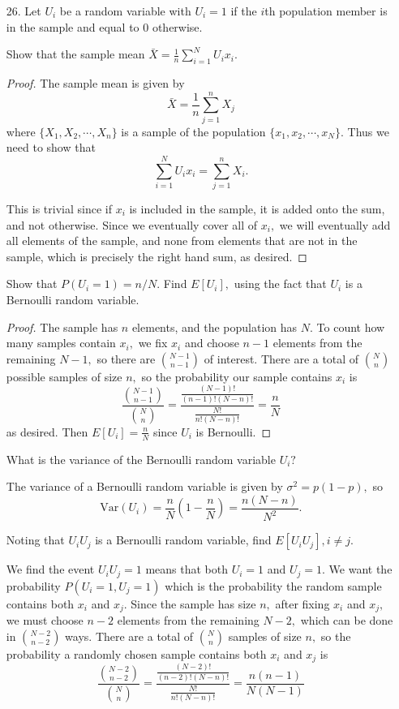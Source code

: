 \documentclass{article}
\newcommand{\var}{\mathrm{Var}}
\begin{document}
\begin{itemize}
	\item[26.] Let $U_i$ be a random variable with $U_i=1$ if the $i$th population member is in the sample and equal to 0 otherwise. 
		\begin{enumerate}[a.]
			\ii Show that the sample mean $\bar{X}=\displaystyle\frac{1}{n}\sum_{i=1}^N U_i x_i.$ 
			\begin{proof}
				The sample mean is given by \[\bar{X}=\frac{1}{n}\sum_{j=1}^n X_j\] where $\{X_1, X_2, \cdots, X_n\}$ is a sample of the population $\{x_1, x_2, \cdots, x_N\}.$ Thus we need to show that \[\sum_{i=1}^N U_i x_i = \sum_{j=1}^n X_i.\] 

			This is trivial since if $x_i$ is included in the sample, it is added onto the sum, and not otherwise. Since we eventually cover all of $x_i,$ we will eventually add all elements of the sample, and none from elements that are not in the sample, which is precisely the right hand sum, as desired.

			\end{proof}
			
			\ii Show that $P(U_i=1)=n/N$. Find $E[U_i],$ using the fact that $U_i$ is a Bernoulli random variable.
			\begin{proof}
				The sample has $n$ elements, and the population has $N.$ To count how many samples contain $x_i,$ we fix $x_i$ and choose $n-1$ elements from the remaining $N-1,$ so there are $\binom{N-1}{n-1}$ of interest. There are a total of $\binom{N}{n}$ possible samples of size $n,$ so the probability our sample contains $x_i$ is \[\frac{\binom{N-1}{n-1}}{\binom{N}{n}} = \frac{\frac{(N-1)!}{(n-1)!(N-n)!}}{\frac{N!}{n!(N-n)!}} = \frac{n}{N}\] as desired.	Then $E[U_i]=\boxed{\frac{n}{N}}$ since $U_i$ is Bernoulli.

			\end{proof}

			\ii What is the variance of the Bernoulli random variable $U_i?$
			\begin{soln}
				The variance of a Bernoulli random variable is given by $\sigma^2=p(1-p),$ so \[\var(U_i)=\frac{n}{N}\left( 1-\frac{n}{N} \right)=\boxed{\frac{n(N-n)}{N^2}.}\]	
				
			\end{soln}

			\ii Noting that $U_iU_j$ is a Bernoulli random variable, find $E[U_iU_j], i\neq j.$
			\begin{soln}
				We find the event $U_iU_j=1$ means that both $U_i=1$ and $U_j=1.$ We want the probability $P(U_i=1, U_j=1)$ which is the probability the random sample contains both $x_i$ and $x_j.$ Since the sample has size $n,$ after fixing $x_i$ and $x_j,$ we must choose $n-2$ elements from the remaining $N-2,$ which can be done in $\binom{N-2}{n-2}$ ways. There are a total of $\binom{N}{n}$ samples of size $n,$ so the probability a randomly chosen sample contains both $x_i$ and $x_j$ is \[\frac{\binom{N-2}{n-2}}{\binom{N}{n}} = \frac{\frac{(N-2)!}{(n-2)!(N-n)!}}{\frac{N!}{n!(N-n)!}} = \frac{n(n-1)}{N(N-1)}\]


\end{soln}
\end{enumerate}
\end{itemize}
\end{document}
